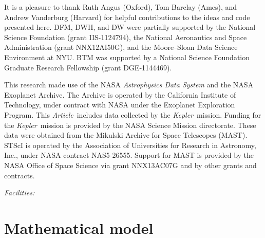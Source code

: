\documentclass[12pt,preprint]{aastex}
\newcommand{\project}[1]{\textsl{#1}} %
\newcommand{\kepler}{\project{Kepler}}
\newcommand{\paper}{\textsl{Article}}
\newcommand{\sectlabel}[1]{\label{sect:#1}}
\begin{document}
\acknowledgments
It is a pleasure to thank
Ruth Angus (Oxford),
Tom Barclay (Ames), and
Andrew Vanderburg (Harvard)
for helpful contributions to the ideas and code presented here.
DFM, DWH, and DW were partially supported by the National Science Foundation
(grant IIS-1124794),
the National Aeronautics and Space Administration
(grant NNX12AI50G), and the Moore--Sloan Data Science Environment at NYU.
BTM was supported by a National Science Foundation Graduate Research
Fellowship (grant DGE‐1144469).

This research made use of the NASA \project{Astrophysics Data System} and the
NASA Exoplanet Archive.
The Archive is operated by the California Institute of Technology, under
contract with NASA under the Exoplanet Exploration Program.
This \paper\ includes data collected by the \kepler\ mission. Funding for the
\kepler\ mission is provided by the NASA Science Mission directorate.
These data were obtained from the Mikulski Archive for Space Telescopes
(MAST).
STScI is operated by the Association of Universities for Research in
Astronomy, Inc., under NASA contract NAS5-26555.
Support for MAST is provided by the NASA Office of Space Science via grant
NNX13AC07G and by other grants and contracts.

{\it Facilities:} 

\appendix

\section{Mathematical model}
\sectlabel{math}
\end{document}
